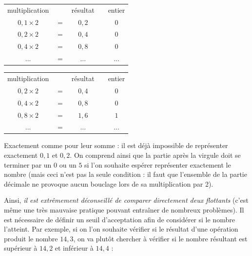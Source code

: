 \documentclass[11pt,a4paper]{article}
\begin{document}
\begin{table}[!ht]
  \centering
  \begin{minipage}{0.50\textwidth}
    \centering

\begin{center}
\begin{tabular}{c c c   m{1cm}   c }
multiplication        &         & résultat    & & entier \\
$ 0,1 \times 2 $  &  $ = $  &  $ 0,2 $  & & $ 0 $ \\
$ 0,2 \times 2 $  &  $ = $  &  $ 0,4 $  & & $ 0 $ \\
$ 0,4 \times 2 $  &  $ = $  &  $ 0,8 $  & & $ 0 $ \\
 ... & $ = $ & ... & & ... \\
\end{tabular}
\end{center}

  \end{minipage}
  \hfillx
  \begin{minipage}{0.50\textwidth}
    \centering

\begin{center}
\begin{tabular}{c c c   m{1cm}   c }
multiplication        &         & résultat    & & entier \\
$ 0,2 \times 2 $  &  $ = $  &  $ 0,4 $  & & $ 0 $ \\
$ 0,4 \times 2 $  &  $ = $  &  $ 0,8 $  & & $ 0 $ \\
$ 0,8 \times 2 $  &  $ = $  &  $ 1,6 $  & & $ 1 $ \\
 ... & $ = $ & ... & & ... \\
\end{tabular}
\end{center}

  \end{minipage}
\end{table}

Exactement comme pour leur somme : il est déjà impossible de représenter exactement $ 0,1 $ et $ 0,2 $.
On comprend ainsi que la partie après la virgule doit se terminer par un $ 0 $ ou un $ 5 $ si l'on souhaite espérer représenter exactement le nombre (mais ceci n'est pas la seule condition : il faut que l'ensemble de la partie décimale ne provoque aucun bouclage lors de sa multiplication par 2).

\medskip

Ainsi, \textit{il est extrêmement déconseillé de comparer directement deux flottants} (c'est même une très mauvaise pratique pouvant entraîner de nombreux problèmes).
Il est nécessaire de définir un seuil d'acceptation afin de considérer si le nombre l'atteint.
Par exemple, si on l'on souhaite vérifier si le résultat d'une opération produit le nombre $ 14,3 $, on va plutôt chercher à vérifier si le nombre résultant est supérieur à $ 14,2 $ et inférieur à $ 14,4 $ :
\end{document}
